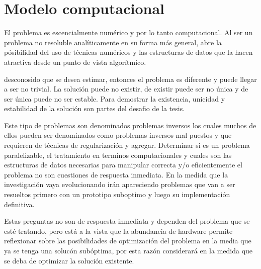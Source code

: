 
\section{Modelo computacional}

El problema es escencialmente numérico y por lo tanto
computacional. Al ser un problema no resoluble analíticamente en su
forma más general, abre la pósibilidad del uso de técnicas numéricos y
las estructuras de datos que la hacen atractiva desde un punto de
vista algorítmico.

desconosido que se desea estimar, entonces el problema es diferente y
puede llegar a ser no trivial. La solución puede no existir, de
existir puede ser no única y de ser única puede no ser estable. Para
demostrar la existencia, unicidad y estabilidad de la solución son
partes del desafio de la tesis.

Este tipo de problemas son denominados problemas inversos los cuales
muchos de ellos pueden ser denominados como problemas inversos mal
puestos y que requieren de técnicas de regularización y agregar.
Determinar si es un problema paralelizable, el tratamiento en terminos
computacionales y cuales son las estructuras de datos necesarias para
manipular correcta y/o eficientemente el problema no son cuestiones de
respuesta inmediata. En la medida que la investigación vaya
evolucionando irán apareciendo problemas que van a ser resueltos
primero con un prototipo suboptimo y luego su implementación definitiva.

Estas preguntas no son de respuesta inmediata y dependen del problema
que se esté tratando, pero está a la vista que la abundancia de
hardware permite reflexionar sobre las posibilidades de optimización
del problema en la media que ya se tenga una solucón subóptima, por
esta razón considerará en la medida que se deba de optimizar la
solución existente.